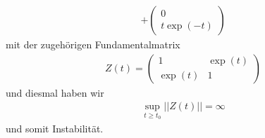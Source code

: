 \begin{solution}
\begin{enumerate}[label = \textbf{\alph*)}]
\begin{align*}
    + \begin{pmatrix}
      0 \\ t\exp(-t)
    \end{pmatrix}
  \end{align*}
  mit der zugehörigen Fundamentalmatrix
  \begin{align*}
    Z(t) = \begin{pmatrix}
      1 & \exp(t) \\
      \exp(t) & 1
    \end{pmatrix}
  \end{align*}
  und diesmal haben wir
  \begin{align*}
    \sup_{t \geq t_0} ||Z(t)|| = \infty
  \end{align*}
  und somit Instabilität.
\end{enumerate}
\end{solution}
